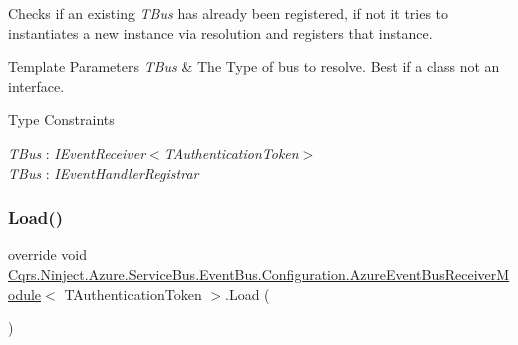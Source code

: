Checks if an existing {\itshape T\+Bus}  has already been registered, if not it tries to instantiates a new instance via resolution and registers that instance. 


\begin{DoxyTemplParams}{Template Parameters}
{\em T\+Bus} & The Type of bus to resolve. Best if a class not an interface.\\
\hline
\end{DoxyTemplParams}
\begin{Desc}
\item[Type Constraints]\begin{description}
\item[{\em T\+Bus} : {\em I\+Event\+Receiver$<$T\+Authentication\+Token$>$}]\item[{\em T\+Bus} : {\em I\+Event\+Handler\+Registrar}]\end{description}
\end{Desc}
\mbox{\label{classCqrs_1_1Ninject_1_1Azure_1_1ServiceBus_1_1EventBus_1_1Configuration_1_1AzureEventBusReceiverModule_a806a400a3eec26d81ab200a425ef6121_a806a400a3eec26d81ab200a425ef6121}} 
\subsubsection{\texorpdfstring{Load()}{Load()}}
{\footnotesize\ttfamily override void \hyperlink{classCqrs_1_1Ninject_1_1Azure_1_1ServiceBus_1_1EventBus_1_1Configuration_1_1AzureEventBusReceiverModule}{Cqrs.\+Ninject.\+Azure.\+Service\+Bus.\+Event\+Bus.\+Configuration.\+Azure\+Event\+Bus\+Receiver\+Module}$<$ T\+Authentication\+Token $>$.Load (\begin{DoxyParamCaption}{ }\end{DoxyParamCaption})}



